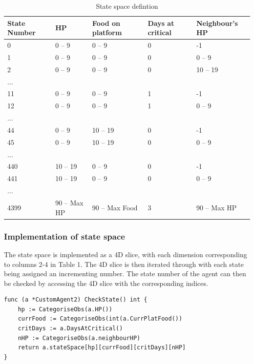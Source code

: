 \begin{table}
\centering
\caption{State space defintion}
\label{state-table}
\begin{adjustbox}{width=\columnwidth,center}
\begin{tabular}{@{}lllll@{}}
\toprule
State Number & HP          & Food on platform & Days at critical & Neighbour’s HP \\ \midrule
0            & 0 – 9       & 0 – 9            & 0                & -1             \\
1            & 0 – 9       & 0 – 9            & 0                & 0 – 9          \\
2            & 0 – 9       & 0 – 9            & 0                & 10 – 19        \\
...          &             &                  &                  &                \\
11           & 0 – 9       & 0 – 9            & 1                & -1             \\
12           & 0 – 9       & 0 – 9            & 1                & 0 – 9          \\
...          &             &                  &                  &                \\
44           & 0 – 9       & 10 – 19          & 0                & -1             \\
45           & 0 – 9       & 10 – 19          & 0                & 0 – 9          \\
...          &             &                  &                  &                \\
440          & 10 – 19     & 0 – 9            & 0                & -1             \\
441          & 10 – 19     & 0 – 9            & 0                & 0 – 9          \\
...          &             &                  &                  &                \\
4399         & 90 – Max HP & 90 – Max Food    & 3                & 90 – Max HP    \\ \bottomrule
\end{tabular}
\end{adjustbox}
\end{table}
\subsubsection{Implementation of state space}
The state space is implemented as a 4D slice, with each dimension corresponding to columns 2-4 in Table 1. The 4D slice is then iterated through with each state being assigned an incrementing number. The state number of the agent can then be checked by accessing the 4D slice with the corresponding indices.
\begin{lstlisting}
func (a *CustomAgent2) CheckState() int {
	hp := CategoriseObs(a.HP())
	currFood := CategoriseObs(int(a.CurrPlatFood())
	critDays := a.DaysAtCritical()
	nHP := CategoriseObs(a.neighbourHP)
	return a.stateSpace[hp][currFood][critDays][nHP]
}
\end{lstlisting}

